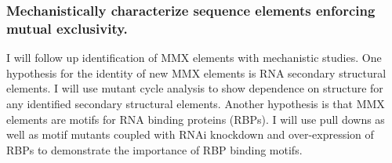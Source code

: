 \documentclass{article}
\begin{document}
\subsubsection{Mechanistically characterize sequence elements enforcing mutual exclusivity.} \label{aim:PKM_mechanistic}
I will follow up identification of MMX elements with mechanistic studies. 
One hypothesis for the identity of new MMX elements is RNA secondary structural elements. 
I will use mutant cycle analysis to show dependence on structure for any identified secondary structural elements. 
Another hypothesis is that MMX elements are motifs for RNA binding proteins (RBPs).
I will use pull downs as well as motif mutants coupled with RNAi knockdown and over-expression of RBPs to demonstrate the importance of RBP binding motifs. 







\printbibliography
\end{document}
